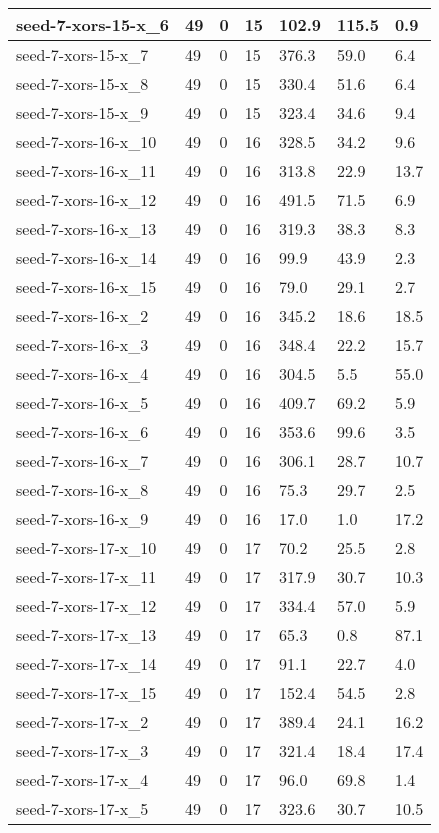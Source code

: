 \begin{scriptsize}
\begin{longtable}{|p{5cm}|l|l|l|l|l|l|}
seed-7-xors-15-x\_6&49&0&15&102.9&115.5&0.9 \\ \hline 
seed-7-xors-15-x\_7&49&0&15&376.3&59.0&6.4 \\ \hline 
seed-7-xors-15-x\_8&49&0&15&330.4&51.6&6.4 \\ \hline 
seed-7-xors-15-x\_9&49&0&15&323.4&34.6&9.4 \\ \hline 
seed-7-xors-16-x\_10&49&0&16&328.5&34.2&9.6 \\ \hline 
seed-7-xors-16-x\_11&49&0&16&313.8&22.9&13.7 \\ \hline 
seed-7-xors-16-x\_12&49&0&16&491.5&71.5&6.9 \\ \hline 
seed-7-xors-16-x\_13&49&0&16&319.3&38.3&8.3 \\ \hline 
seed-7-xors-16-x\_14&49&0&16&99.9&43.9&2.3 \\ \hline 
seed-7-xors-16-x\_15&49&0&16&79.0&29.1&2.7 \\ \hline 
seed-7-xors-16-x\_2&49&0&16&345.2&18.6&18.5 \\ \hline 
seed-7-xors-16-x\_3&49&0&16&348.4&22.2&15.7 \\ \hline 
seed-7-xors-16-x\_4&49&0&16&304.5&5.5&55.0 \\ \hline 
seed-7-xors-16-x\_5&49&0&16&409.7&69.2&5.9 \\ \hline 
seed-7-xors-16-x\_6&49&0&16&353.6&99.6&3.5 \\ \hline 
seed-7-xors-16-x\_7&49&0&16&306.1&28.7&10.7 \\ \hline 
seed-7-xors-16-x\_8&49&0&16&75.3&29.7&2.5 \\ \hline 
seed-7-xors-16-x\_9&49&0&16&17.0&1.0&17.2 \\ \hline 
seed-7-xors-17-x\_10&49&0&17&70.2&25.5&2.8 \\ \hline 
seed-7-xors-17-x\_11&49&0&17&317.9&30.7&10.3 \\ \hline 
seed-7-xors-17-x\_12&49&0&17&334.4&57.0&5.9 \\ \hline 
seed-7-xors-17-x\_13&49&0&17&65.3&0.8&87.1 \\ \hline 
seed-7-xors-17-x\_14&49&0&17&91.1&22.7&4.0 \\ \hline 
seed-7-xors-17-x\_15&49&0&17&152.4&54.5&2.8 \\ \hline 
seed-7-xors-17-x\_2&49&0&17&389.4&24.1&16.2 \\ \hline 
seed-7-xors-17-x\_3&49&0&17&321.4&18.4&17.4 \\ \hline 
seed-7-xors-17-x\_4&49&0&17&96.0&69.8&1.4 \\ \hline 
seed-7-xors-17-x\_5&49&0&17&323.6&30.7&10.5 \\ \hline 

\end{longtable}
\end{scriptsize}
